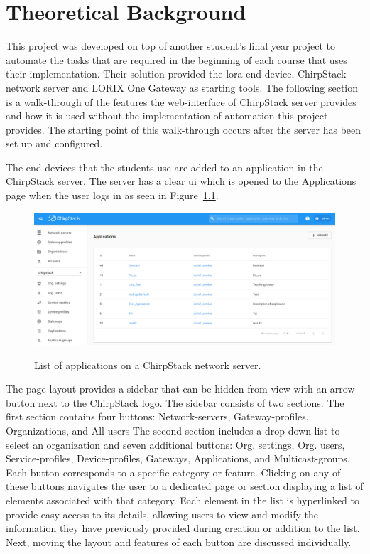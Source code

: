 
\chapter{Theoretical Background} \label{ch:theor_backgr}

This project was developed on top of another student's final year project \cite{theseus:gere-zoltan} to automate the tasks that are required in the beginning of each course that uses their implementation.
Their solution provided the \gls{lora} end device, ChirpStack network server and LORIX One Gateway as starting tools.
The following section is a walk-through of the features the web-interface of ChirpStack server provides and how it is used without the implementation of automation this project provides.
The starting point of this walk-through occurs after the server has been set up and configured.

The end devices that the students use are added to an application in the ChirpStack server.
The server has a clear \gls{ui} which is opened to the Applications page when the user logs in as seen in Figure~\ref{fig:ChirpStack_application_list}.

\begin{figure}[ht]
  \centering
  {\includegraphics[width=\textwidth]{illustration/ChirpStack_application_list.png}}
  \caption{List of applications on a ChirpStack network server.}
  \label{fig:ChirpStack_application_list}
\end{figure}

The page layout provides a sidebar that can be hidden from view with an arrow button next to the ChirpStack logo.
The sidebar consists of two sections.
The first section contains four buttons: Network-servers, Gateway-profiles, Organizations, and All users
The second section includes a drop-down list to select an organization and seven additional buttons: Org. settings, Org. users, Service-profiles, Device-profiles, Gateways, Applications, and Multicast-groups.
Each button corresponds to a specific category or feature.
Clicking on any of these buttons navigates the user to a dedicated page or section displaying a list of elements associated with that category.
Each element in the list is hyperlinked to provide easy access to its details, allowing users to view and modify the information they have previously provided during creation or addition to the list.
Next, moving the layout and features of each button are discussed individually.

